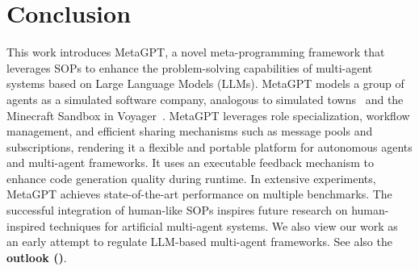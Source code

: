 \section{Conclusion}
This work introduces MetaGPT, a novel meta-programming framework that leverages SOPs to enhance the problem-solving capabilities of multi-agent systems based on Large Language Models (LLMs).
%
MetaGPT models a group of agents as a simulated software company, 
analogous to simulated towns~\citep{park2023generative} and the Minecraft Sandbox in Voyager~\citep{wang2023voyager}. 
%
MetaGPT leverages role specialization, workflow management, and efficient sharing mechanisms such as message pools and subscriptions, rendering it a flexible and portable platform for autonomous agents and multi-agent frameworks. 
It uses an executable feedback mechanism to enhance code generation quality during runtime.  
%
In extensive experiments, MetaGPT achieves state-of-the-art performance on multiple benchmarks. 
The successful integration of human-like SOPs inspires future research on human-inspired techniques for artificial multi-agent systems.
%
We also view our work as an early attempt to regulate LLM-based multi-agent frameworks.
%
See also the \textbf{outlook ()}.